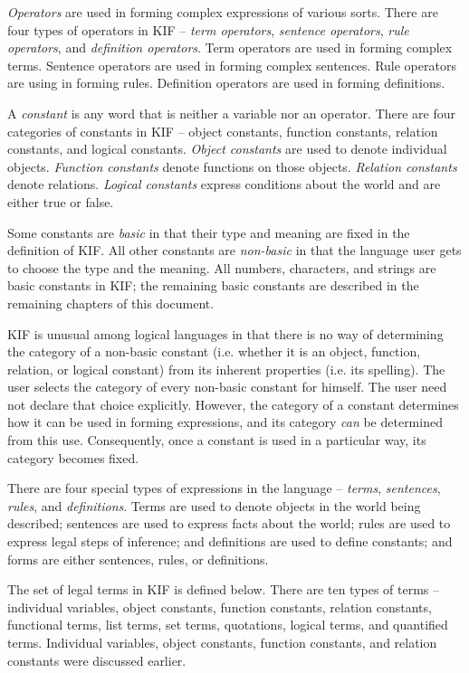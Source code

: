 {\it Operators} are used in forming complex expressions of various sorts.  There
are four types of operators in KIF -- {\it term operators}, {\it sentence
operators}, {\it rule operators}, and {\it definition operators}.  Term operators
are used in forming complex terms.  Sentence operators are used in forming
complex sentences.  Rule operators are using in forming rules.  Definition
operators are used in forming  definitions.

A {\it constant} is any word that is neither a variable nor an operator.  There
are four categories of constants in KIF -- object constants, function constants,
relation constants, and logical constants.  {\it Object constants} are used to
denote individual objects.  {\it Function constants} denote functions on those
objects.  {\it Relation constants} denote relations.  {\it Logical constants}
express conditions about the world and are either true or false.

Some constants are {\it basic} in that their type and meaning are fixed in the
definition of KIF.  All other constants are {\it non-basic} in that the language
user gets to choose the type and the meaning.  All numbers, characters, and
strings are basic constants in KIF; the remaining basic constants are described in
the remaining chapters of this document.

KIF is unusual among logical languages in that there is no way of determining
the category of a non-basic constant (i.e. whether it is an object, function,
relation, or logical constant) from its inherent properties (i.e. its spelling). 
The user selects the category of every non-basic constant for himself.  The user
need not declare that choice explicitly.  However, the category of a constant
determines how it can be used in forming expressions, and its category
{\it can} be determined from this use.   Consequently, once a constant is used in
a particular way, its category becomes fixed.  

There are four special types of expressions in the language -- {\it terms}, {\it
sentences}, {\it rules}, and {\it definitions}.  Terms are used to denote objects in the
world being described; sentences are used to express facts about the world; rules are
used to express legal steps of inference; and definitions are used to define constants;
and forms are either sentences, rules, or definitions.

The set of legal terms in KIF is defined below.   There are ten types of terms --
individual variables, object constants, function constants, relation constants,
functional terms, list terms, set terms, quotations, logical terms, and quantified
terms.  Individual variables, object constants, function constants, and relation
constants were discussed earlier.
 
